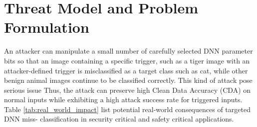 \documentclass[conference,10pt]{IEEEtran}
\begin{document}
\section{Threat Model and Problem Formulation}

An attacker can manipulate a small number of carefully selected DNN parameter bits so that an image containing a specific trigger, such as a tiger image with an attacker-defined trigger is misclassified as a target class such as cat, while other benign animal images continue to be classified correctly. This kind of attack pose serious issue Thus, the attack can preserve high Clean Data Accuracy (CDA) on normal inputs while exhibiting a high attack success rate for triggered inputs. Table \ref{tab:real_world_impact} list potential real-world consequences of targeted DNN miss- classification in security critical and safety critical applications.
\end{document}
